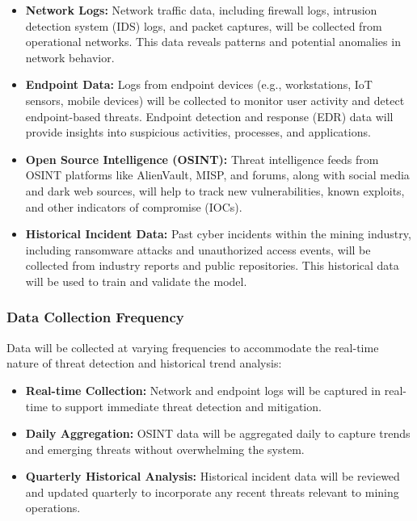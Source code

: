 \documentclass[a4paper,twoside,12pt]{report}
\begin{document}
\begin{itemize}
    \item \textbf{Network Logs:} Network traffic data, including firewall logs, intrusion detection system (IDS) logs, and packet captures, will be collected from operational networks. This data reveals patterns and potential anomalies in network behavior.
    
    \item \textbf{Endpoint Data:} Logs from endpoint devices (e.g., workstations, IoT sensors, mobile devices) will be collected to monitor user activity and detect endpoint-based threats. Endpoint detection and response (EDR) data will provide insights into suspicious activities, processes, and applications.
    
    \item \textbf{Open Source Intelligence (OSINT):} Threat intelligence feeds from OSINT platforms like AlienVault, MISP, and forums, along with social media and dark web sources, will help to track new vulnerabilities, known exploits, and other indicators of compromise (IOCs).
    
    \item \textbf{Historical Incident Data:} Past cyber incidents within the mining industry, including ransomware attacks and unauthorized access events, will be collected from industry reports and public repositories. This historical data will be used to train and validate the model.
\end{itemize}

\subsubsection{Data Collection Frequency}

Data will be collected at varying frequencies to accommodate the real-time nature of threat detection and historical trend analysis:

\begin{itemize}
    \item \textbf{Real-time Collection:} Network and endpoint logs will be captured in real-time to support immediate threat detection and mitigation.
    
    \item \textbf{Daily Aggregation:} OSINT data will be aggregated daily to capture trends and emerging threats without overwhelming the system.
    
    \item \textbf{Quarterly Historical Analysis:} Historical incident data will be reviewed and updated quarterly to incorporate any recent threats relevant to mining operations.
\end{itemize}
\end{document}
